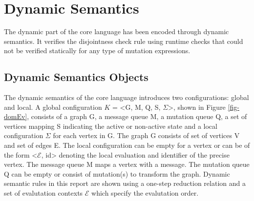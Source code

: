 \section{Dynamic Semantics}
\label{sec:semantics}

The dynamic part of the core language has been encoded through dynamic semantics. It verifies the disjointness check rule using runtime checks that could not be verified statically for any type of mutation expressions.

\subsection{Dynamic Semantics Objects}
\label{subsec:dom}

The dynamic semantics of the core language introduces two configurations: global and local. A global configuration $K$ = <G, M, Q, S, $\Sigma$>, shown in Figure \ref{fig-domEv}, consists of a graph G, a message queue M, a mutation queue Q, a set of vertices mapping S indicating the active or non-active state and a local configuration $\Sigma$ for each vertex in G. The graph G consists of set of vertices V and set of edges E. The local configuration  can be empty for a vertex or can be of the form <$\mathscr{E}$, id> denoting the local evaluation and identifier of the precise vertex. The message queue M maps a vertex with a message. The mutation queue Q can be empty or consist of mutation(s) to transform the graph. Dynamic semantic rules in this report are shown using a one-step reduction relation and a set of evalutation contexts $\mathscr{E}$ which specify the evalutation order. 

